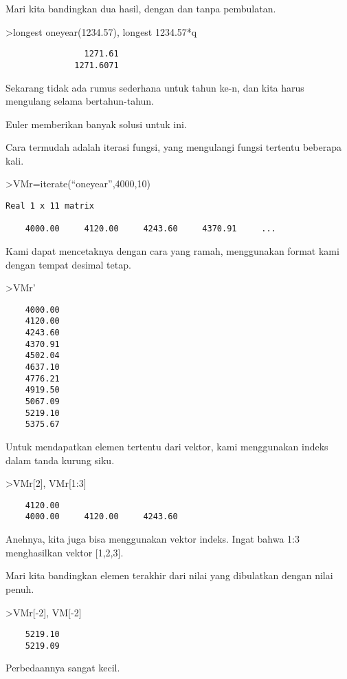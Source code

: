 \documentclass[
]{book}
\begin{document}
Mari kita bandingkan dua hasil, dengan dan tanpa pembulatan.

\textgreater longest oneyear(1234.57), longest 1234.57*q

\begin{verbatim}
                1271.61 
              1271.6071 
\end{verbatim}

Sekarang tidak ada rumus sederhana untuk tahun ke-n, dan kita harus mengulang selama bertahun-tahun.

Euler memberikan banyak solusi untuk ini.

Cara termudah adalah iterasi fungsi, yang mengulangi fungsi tertentu beberapa kali.

\textgreater VMr=iterate(``oneyear'',4000,10)

\begin{verbatim}
Real 1 x 11 matrix

    4000.00     4120.00     4243.60     4370.91     ...
\end{verbatim}

Kami dapat mencetaknya dengan cara yang ramah, menggunakan format kami dengan tempat desimal tetap.

\textgreater VMr'

\begin{verbatim}
    4000.00 
    4120.00 
    4243.60 
    4370.91 
    4502.04 
    4637.10 
    4776.21 
    4919.50 
    5067.09 
    5219.10 
    5375.67 
\end{verbatim}

Untuk mendapatkan elemen tertentu dari vektor, kami menggunakan indeks dalam tanda kurung siku.

\textgreater VMr{[}2{]}, VMr{[}1:3{]}

\begin{verbatim}
    4120.00 
    4000.00     4120.00     4243.60 
\end{verbatim}

Anehnya, kita juga bisa menggunakan vektor indeks. Ingat bahwa 1:3 menghasilkan vektor {[}1,2,3{]}.

Mari kita bandingkan elemen terakhir dari nilai yang dibulatkan dengan nilai penuh.

\textgreater VMr{[}-2{]}, VM{[}-2{]}

\begin{verbatim}
    5219.10 
    5219.09 
\end{verbatim}

Perbedaannya sangat kecil.
\end{document}
